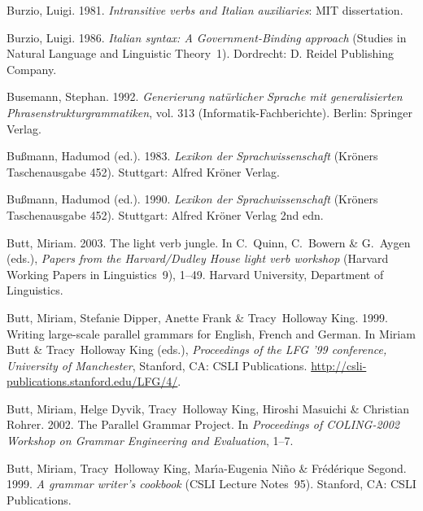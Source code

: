 \begin{thebibliography}{1420}
Burzio, Luigi. 1981.
\newblock \emph{Intransitive verbs and {Italian} auxiliaries}: MIT
  dissertation.

Burzio, Luigi. 1986.
\newblock \emph{Italian syntax: {A Government-Binding} approach} (Studies in
  Natural Language and Linguistic Theory~1).
\newblock Dordrecht: D. Reidel Publishing Company.

Busemann, Stephan. 1992.
\newblock \emph{{Generierung nat{\"u}rlicher Sprache mit generalisierten
  Phrasenstrukturgrammatiken}}, vol. 313  (Informatik-Fachberichte).
\newblock Berlin: Springer Verlag.

Bu{\ss}mann, Hadumod (ed.). 1983.
\newblock \emph{{Lexikon der Sprachwissenschaft}} (Kr{\"o}ners Taschenausgabe
  452).
\newblock Stuttgart: Alfred Kr{\"o}ner Verlag.

Bu{\ss}mann, Hadumod (ed.). 1990.
\newblock \emph{{Lexikon der Sprachwissenschaft}} (Kr{\"o}ners Taschenausgabe
  452).
\newblock Stuttgart: Alfred Kr{\"o}ner Verlag 2nd edn.

Butt, Miriam. 2003.
\newblock The light verb jungle.
\newblock In C.~Quinn, C.~Bowern \& G.~Aygen (eds.), \emph{Papers from the
  {Harvard/Dudley House} light verb workshop} (Harvard Working Papers in
  Linguistics~9), 1--49. Harvard University, Department of Linguistics.

Butt, Miriam, Stefanie Dipper, Anette Frank \& Tracy~Holloway King.
  1999{}.
\newblock Writing large-scale parallel grammars for {English}, {French} and
  {German}.
\newblock In Miriam Butt \& Tracy~Holloway King (eds.), \emph{Proceedings of
  the {LFG '99} conference, {University of Manchester}}, Stanford, CA: CSLI
  Publications.
\newblock \urlprefix\url{http://csli-publications.stanford.edu/LFG/4/}.

Butt, Miriam, Helge Dyvik, Tracy~Holloway King, Hiroshi Masuichi \& Christian
  Rohrer. 2002.
\newblock The {Parallel Grammar Project}.
\newblock In \emph{Proceedings of {COLING-2002 Workshop on Grammar Engineering
  and Evaluation}}, 1--7.

Butt, Miriam, Tracy~Holloway King, Mar{\'\i}a-Eugenia Ni{\~n}o \&
  Fr{\'e}d{\'e}rique Segond. 1999{}.
\newblock \emph{A grammar writer's cookbook} (CSLI Lecture Notes~95).
\newblock Stanford, CA: CSLI Publications.


\end{thebibliography}
